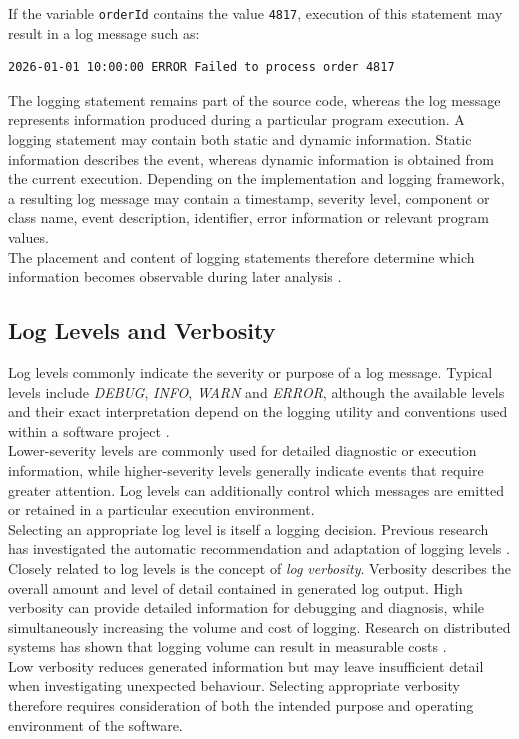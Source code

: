 If the variable \texttt{orderId} contains the value \texttt{4817}, execution of this statement may result in a log message such as:

\begin{verbatim}
2026-01-01 10:00:00 ERROR Failed to process order 4817
\end{verbatim}

The logging statement remains part of the source code, whereas the log message represents information produced during a particular program execution.
A logging statement may contain both static and dynamic information. Static information describes the event,
whereas dynamic information is obtained from the current execution. Depending on the implementation 
and logging framework, a resulting log message may contain a timestamp, severity level, component or 
class name, event description, identifier, error information or relevant program values.
\\
The placement and content of logging statements therefore determine which information becomes observable during later analysis \cite{fu2014wheredodeveloperslog}.

\subsection{Log Levels and Verbosity}
\label{subsec:levels_verbosity}

Log levels commonly indicate the severity or purpose of a log message. 
Typical levels include \textit{DEBUG}, \textit{INFO}, \textit{WARN} and \textit{ERROR}, 
although the available levels and their exact interpretation depend on the logging utility and conventions 
used within a software project \cite{chen2020studyingtheuseofjavaloggingutilities}.
\\
Lower-severity levels are commonly used for detailed diagnostic or execution information, 
while higher-severity levels generally indicate events that require greater attention. 
Log levels can additionally control which messages are emitted or retained in a particular execution environment.
\\
Selecting an appropriate log level is itself a logging decision. 
Previous research has investigated the automatic recommendation and adaptation of logging levels \cite{zhu2015learningtolog,mizouchi2019padla,mastropaolo2022usingdeeplearning}.
\\
Closely related to log levels is the concept of \textit{log verbosity}. 
Verbosity describes the overall amount and level of detail contained in generated log output.
High verbosity can provide detailed information for debugging and diagnosis, while simultaneously increasing the volume 
and cost of logging. Research on distributed systems has shown that logging volume can result in measurable
costs \cite{gholamian2021whatdistributedsystemssay}.
\\
Low verbosity reduces generated information but may leave insufficient detail
when investigating unexpected behaviour. Selecting appropriate verbosity therefore requires consideration of both the intended purpose 
and operating environment of the software.

